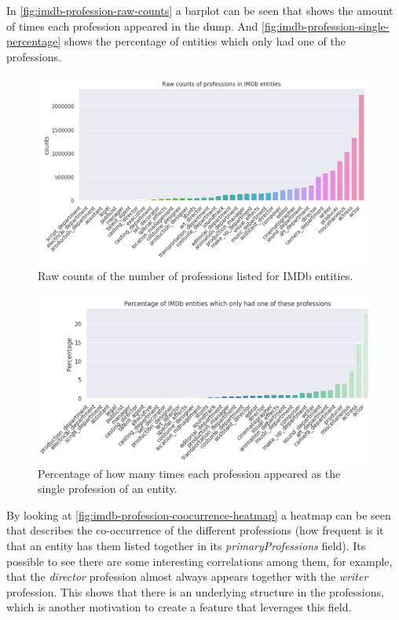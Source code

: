 \documentclass[epsfig,a4paper,11pt,titlepage,twoside,openany]{book}
\begin{document}
In \autoref{fig:imdb-profession-raw-counts} a barplot can be seen that shows the amount of times each profession appeared in the dump. And \autoref{fig:imdb-profession-single-percentage} shows the percentage of entities which only had one of the professions.

\begin{figure}[H]
  \centering \includegraphics[width=\textwidth]{raw_profession_counts_imdb}
  \caption{Raw counts of the number of professions listed for IMDb entities.}
  \label{fig:imdb-profession-raw-counts}
\end{figure}


\begin{figure}[H]
  \centering \includegraphics[width=\textwidth]{imdb_percentage_single_professions}
  \caption{Percentage of how many times each profession appeared as the single profession of an entity.}
  \label{fig:imdb-profession-single-percentage}
\end{figure}


By looking at \autoref{fig:imdb-profession-coocurrence-heatmap} a heatmap can be seen that describes the co-occurrence of the different professions (how frequent is it that an entity has them listed together in its \textit{primaryProfessions} field). Its possible to see there are some interesting correlations among them, for example, that the \textit{director} profession almost always appears together with the \textit{writer} profession. This shows that there is an underlying structure in the professions, which is another motivation to create a feature that leverages this field.
\end{document}
